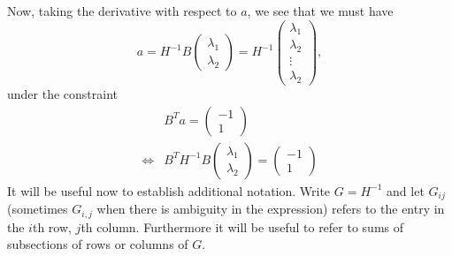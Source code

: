 \documentclass[11pt]{article}
\theoremstyle{definition}
\theoremstyle{remark}
\numberwithin{equation}{section}
\begin{document}
Now, taking the derivative with respect to $a$, we see that we must have 
\[ a = H^{-1} B \begin{pmatrix} \lambda_1 \\ \lambda_2 \end{pmatrix} = H^{-1} \begin{pmatrix} \lambda_1 \\ \lambda_2 \\ \vdots \\ \lambda_2 \end{pmatrix},\]
under the constraint 
\begin{align*}
&B^Ta = \begin{pmatrix} -1 \\ 1 \end{pmatrix} \\
\iff &B^T H^{-1} B \begin{pmatrix}\lambda_1 \\ \lambda_2 \end{pmatrix} = \begin{pmatrix} -1 \\ 1 \end{pmatrix}
\end{align*}\bigskip
It will be useful now to establish additional notation. Write $G = H^{-1}$ and let $G_{ij}$ (sometimes $G_{i,j}$ when there is ambiguity in the expression) refers to the entry in the $i$th row, $j$th column. Furthermore it will be useful to refer to sums of subsections of rows or columns of $G$. \\
\end{document}
